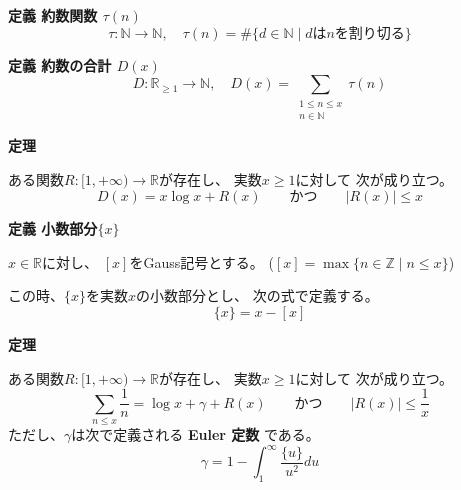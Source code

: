 \documentclass[12pt,b5paper]{ltjsarticle}
\begin{document}
\hrulefill

\textbf{定義\quad
約数関数 $\tau(n)$}
\begin{equation}
 \tau:\mathbb{N}\to\mathbb{N}
  ,\quad
  \tau(n) = \#\{ d\in\mathbb{N} \mid d は n を割り切る \}
\end{equation}

\textbf{定義\quad
約数の合計 $D(x)$}
\begin{equation}
 D : \mathbb{R}_{\geq 1} \to \mathbb{N}
  ,\quad
  D(x)= \sum_{ \substack{1 \leq n \leq x \\ n\in\mathbb{N}} } \tau(n)
\end{equation}

\textbf{定理}

ある関数$R:[1,+\infty)\to\mathbb{R}$が存在し、
実数$x\geq 1$に対して
次が成り立つ。
\begin{equation}
 D(x) = x\log{x} + R(x)
  \qquad かつ \qquad
  \left\lvert R(x) \right\rvert \leq x
\end{equation}


\textbf{定義\quad
 小数部分$\{x\}$}

$x\in\mathbb{R}$に対し、
$[x]$をGauss記号とする。
($[x] = \max \{ n\in\mathbb{Z} \mid n\leq x \}$)

この時、$\{x\}$を実数$x$の小数部分とし、
次の式で定義する。
\begin{equation}
 \{x\} = x-[x]
\end{equation}


\textbf{定理}

ある関数$R:[1,+\infty)\to\mathbb{R}$が存在し、
実数$x\geq 1$に対して
次が成り立つ。
\begin{equation}
 \sum_{n \leq x} \frac{1}{n} = \log{x} + \gamma + R(x)
  \qquad かつ \qquad
  \left\lvert R(x) \right\rvert \leq \frac{1}{x}
\end{equation}
ただし、$\gamma$は次で定義される \textbf{Euler 定数} である。
\begin{equation}
 \gamma = 1 - \int_{1}^{\infty}\frac{ \{u\} }{u^2}du
\end{equation}


\hrulefill
\end{document}
